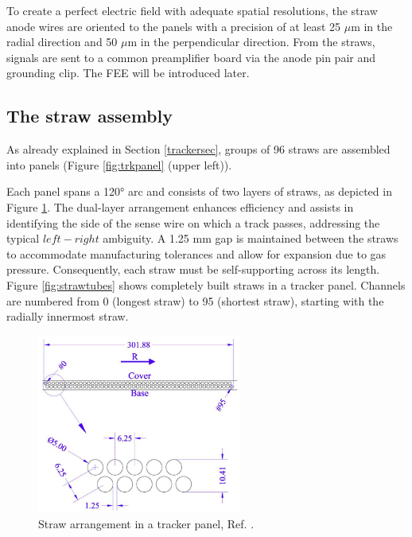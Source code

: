 To create a perfect electric field with adequate spatial resolutions, 
the straw anode wires are oriented 
to the panels with a precision of at least 25 $\mu$m in the 
radial direction and 50 $\mu$m in the 
perpendicular direction. 
From the straws, signals are sent to a common preamplifier board 
via the anode pin pair and grounding clip. The FEE will be introduced later.
\subsection{The straw assembly}
As already explained in Section \ref{trackersec},
groups of 96 straws are assembled into panels (Figure \ref{fig:trkpanel} (upper left)). 

Each panel spans a 120° arc and consists of two layers of straws, 
as depicted in Figure \ref{fig:trktubes}. The dual-layer arrangement 
enhances efficiency and assists in identifying the side of the 
sense wire on which a track passes, addressing the typical $left-right$ 
ambiguity. A 1.25 mm gap is maintained between the straws to accommodate 
manufacturing tolerances and allow for expansion due to gas pressure. 
Consequently, each straw must be self-supporting across its length. 
Figure \ref{fig:strawtubes} shows completely built straws in a tracker panel. 
Channels are numbered from 0 (longest straw) to 95 (shortest straw), starting with the radially innermost straw.
    \begin{figure}[!h]
        \centering
        \includegraphics[width =0.6\textwidth]{figures/png/Screenshot_20240326_234405.png}
        \caption{Straw arrangement in a tracker panel, Ref. \cite{trk}.}
        \label{fig:trktubes}
        \end{figure}

